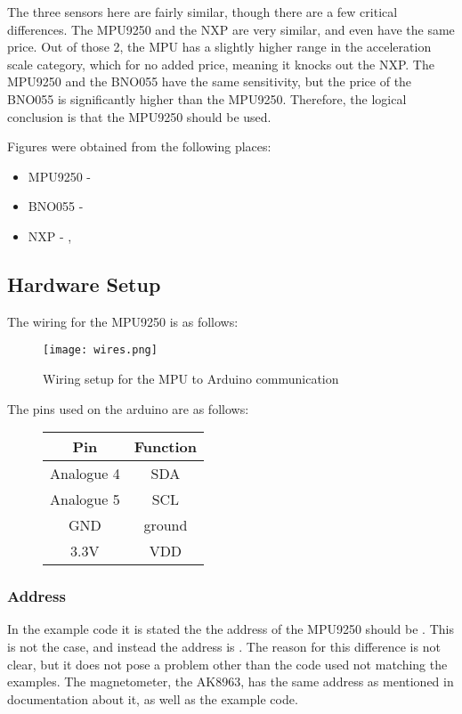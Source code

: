 The three sensors here are fairly similar, though there are a few critical differences.
The MPU9250 and the NXP are very similar, and even have the same price.
Out of those 2, the MPU has a slightly higher range in the acceleration scale category, which for no added price, meaning it knocks out the NXP.
The MPU9250 and the BNO055 have the same sensitivity, but the price of the BNO055 is significantly higher than the MPU9250.
Therefore, the logical conclusion is that the MPU9250 should be used.

Figures were obtained from the following places:
\begin{itemize}
\item MPU9250 - \cite{mpu}
\item BNO055  - \cite{bno}
\item NXP - \cite{nxp1} , \cite{nxp2}
\end{itemize}


\subsection{Hardware Setup}
The wiring for the MPU9250 is as follows:

\begin{figure}[H]
\centering
\texttt{[image: wires.png]}
\caption{Wiring setup for the MPU to Arduino communication}
\label{fig::wiring}
\end{figure}

The pins used on the arduino are as follows: 
\begin{figure}[H]
\centering
\begin{tabular}{|c|c|}
\hline
\textbf{Pin} & \textbf{Function} \\ \hline
Analogue 4 & SDA \\ \hline
Analogue 5 & SCL \\ \hline
GND        & ground  \\ \hline
3.3V       & VDD     \\ \hline
\end{tabular}
\end{figure}

\subsubsection{Address}
In the example code it is stated the the address of the MPU9250 should be .
This is not the case, and instead the address is .
The reason for this difference is not clear, but it does not pose a problem other than the code used not matching the examples.
The magnetometer, the AK8963, has the same address as mentioned in documentation about it, as well as the example code.

